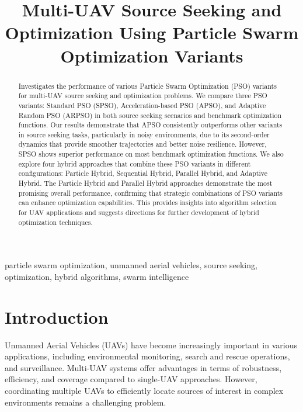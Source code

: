 \documentclass[conference]{IEEEtran}
\begin{document}
\title{Multi-UAV Source Seeking and Optimization Using Particle Swarm Optimization Variants\\
}

\author{
\and
{}
}

\maketitle

\begin{abstract}
Investigates the performance of various Particle Swarm Optimization (PSO) variants for multi-UAV source seeking and optimization problems. We compare three PSO variants: Standard PSO (SPSO), Acceleration-based PSO (APSO), and Adaptive Random PSO (ARPSO) in both source seeking scenarios and benchmark optimization functions. Our results demonstrate that APSO consistently outperforms other variants in source seeking tasks, particularly in noisy environments, due to its second-order dynamics that provide smoother trajectories and better noise resilience. However, SPSO shows superior performance on most benchmark optimization functions. We also explore four hybrid approaches that combine these PSO variants in different configurations: Particle Hybrid, Sequential Hybrid, Parallel Hybrid, and Adaptive Hybrid. The Particle Hybrid and Parallel Hybrid approaches demonstrate the most promising overall performance, confirming that strategic combinations of PSO variants can enhance optimization capabilities. This provides insights into algorithm selection for UAV applications and suggests directions for further development of hybrid optimization techniques.
\end{abstract}

\begin{IEEEkeywords}
particle swarm optimization, unmanned aerial vehicles, source seeking, optimization, hybrid algorithms, swarm intelligence
\end{IEEEkeywords}

\section{Introduction}
Unmanned Aerial Vehicles (UAVs) have become increasingly important in various applications, including environmental monitoring, search and rescue operations, and surveillance. Multi-UAV systems offer advantages in terms of robustness, efficiency, and coverage compared to single-UAV approaches. However, coordinating multiple UAVs to efficiently locate sources of interest in complex environments remains a challenging problem.
\end{document}
